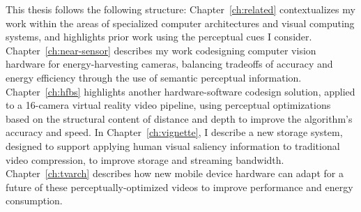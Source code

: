 This thesis follows the following structure:
Chapter~\ref{ch:related} contextualizes my work within the areas of specialized computer architectures and visual computing systems, and highlights prior work using the perceptual cues I consider.
Chapter~\ref{ch:near-sensor} describes my work codesigning computer vision hardware for energy-harvesting cameras, balancing tradeoffs of accuracy and energy efficiency through the use of semantic perceptual information.
Chapter~\ref{ch:hfbs} highlights another hardware-software codesign solution, applied to a 16-camera virtual reality video pipeline, using perceptual optimizations based on the structural content of distance and depth to improve the algorithm's accuracy and speed.
In Chapter~\ref{ch:vignette}, I describe a new storage system, designed to support applying human visual saliency information to traditional video compression, to improve storage and streaming bandwidth.
Chapter~\ref{ch:tvarch} describes how new mobile device hardware can adapt for a future of these perceptually-optimized videos to improve performance and energy consumption.


